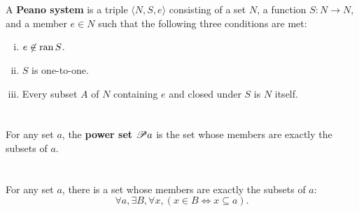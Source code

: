 \documentclass{report}
\begin{document}
\begin{definition}


\end{definition}

\section{}%

A \textbf{Peano system} is a triple $\langle N, S, e \rangle$ consisting of a
  set $N$, a function $S \colon N \rightarrow N$, and a member $e \in N$ such
  that the following three conditions are met:
\begin{enumerate}[(i)]
  \item $e \not\in \mathop{\text{ran}}{S}$.
  \item $S$ is one-to-one.
  \item Every subset $A$ of $N$ containing $e$ and closed under $S$ is $N$
    itself.
\end{enumerate}

\begin{definition}


\end{definition}

\section{}%

For any set $a$, the \textbf{power set $\mathscr{P}a$} is the set whose members
  are exactly the subsets of $a$.

\begin{definition}


\end{definition}

\section{}%

For any set $a$, there is a set whose members are exactly the subsets of $a$:
  $$\forall a, \exists B, \forall x, (x \in B \iff x \subseteq a).$$
\end{document}

